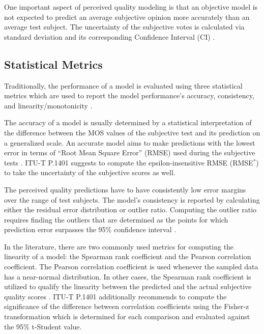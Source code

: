 \documentclass[journal]{IEEEtran}
\begin{document}
One important aspect of perceived quality modeling is that an objective model is not expected to predict an average subjective opinion more accurately than an average test subject. The uncertainty of the subjective votes is calculated via standard deviation and its corresponding Confidence Interval (CI) \cite{itut2012P.1401}.

\subsection{Statistical Metrics}
\label{subsec:Metrics}

Traditionally, the performance of a model is evaluated using three statistical metrics which are used to report the model performance's accuracy, consistency, and linearity/monotonicity \cite{itut2012P.1401}.

The accuracy of a model is usually determined by a statistical interpretation of the difference between the MOS values of the subjective test and its prediction on a generalized scale. An accurate model aims to make predictions with the lowest error in terms of ``Root Mean Square Error'' (RMSE) used during the subjective tests \cite{itut2012P.1401} \cite{garcia2014parametric}. ITU-T P.1401 suggests to compute the epsilon-insensitive RMSE (RMSE$^*$) to take the uncertainty of the subjective scores as well.

The perceived quality predictions have to have consistently low error margins over the range of test subjects. The model's consistency is reported by calculating either the residual error distribution or outlier ratio. Computing the outlier ratio requires finding the outliers that are determined as the points for which prediction error surpasses the 95\% confidence interval \cite{itut2012P.1401} \cite{garcia2014parametric}.

In the literature, there are two commonly used metrics for computing the linearity of a model: the Spearman rank coefficient and the Pearson correlation coefficient. The Pearson correlation coefficient is used whenever the sampled data has a near-normal distribution. In other cases, the Spearman rank coefficient is utilized to qualify the linearity between the predicted and the actual subjective quality scores \cite{garcia2014parametric}. ITU-T P.1401 additionally recommends to compute the significance of the difference between correlation coefficients using the  Fisher-z transformation which is determined for each comparison and evaluated against the 95\% t-Student value.
\end{document}
